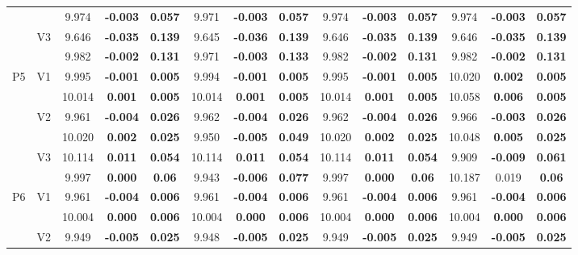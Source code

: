 \documentclass[12pt,a4paper]{article}
\begin{document}
\begin{sidewaystable}[H]
{\begin{tabular}{cc|ccc|ccc|ccc|ccc|}
   &  & 9.974 & \textbf{-0.003} & \textbf{0.057} & 9.971 & \textbf{-0.003} & \textbf{0.057} & 9.974 & \textbf{-0.003} & \textbf{0.057} & 9.974 & \textbf{-0.003} & \textbf{0.057} \\ 
   & \multirow{2}{*}{V3} & 9.646 & \textbf{-0.035} & \textbf{0.139} & 9.645 & \textbf{-0.036} & \textbf{0.139} & 9.646 & \textbf{-0.035} & \textbf{0.139} & 9.646 & \textbf{-0.035} & \textbf{0.139} \\ 
   &  & 9.982 & \textbf{-0.002} & \textbf{0.131} & 9.971 & \textbf{-0.003} & \textbf{0.133} & 9.982 & \textbf{-0.002} & \textbf{0.131} & 9.982 & \textbf{-0.002} & \textbf{0.131} \\ 
   \hline \hline\multirow{6}{*}{P5} & \multirow{2}{*}{V1} & 9.995 & \textbf{-0.001} & \textbf{0.005} & 9.994 & \textbf{-0.001} & \textbf{0.005} & 9.995 & \textbf{-0.001} & \textbf{0.005} & 10.020 & \textbf{0.002} & \textbf{0.005} \\ 
   &  & 10.014 & \textbf{0.001} & \textbf{0.005} & 10.014 & \textbf{0.001} & \textbf{0.005} & 10.014 & \textbf{0.001} & \textbf{0.005} & 10.058 & \textbf{0.006} & \textbf{0.005} \\ 
   & \multirow{2}{*}{V2} & 9.961 & \textbf{-0.004} & \textbf{0.026} & 9.962 & \textbf{-0.004} & \textbf{0.026} & 9.962 & \textbf{-0.004} & \textbf{0.026} & 9.966 & \textbf{-0.003} & \textbf{0.026} \\ 
   &  & 10.020 & \textbf{0.002} & \textbf{0.025} & 9.950 & \textbf{-0.005} & \textbf{0.049} & 10.020 & \textbf{0.002} & \textbf{0.025} & 10.048 & \textbf{0.005} & \textbf{0.025} \\ 
   & \multirow{2}{*}{V3} & 10.114 & \textbf{0.011} & \textbf{0.054} & 10.114 & \textbf{0.011} & \textbf{0.054} & 10.114 & \textbf{0.011} & \textbf{0.054} & 9.909 & \textbf{-0.009} & \textbf{0.061} \\ 
   &  & 9.997 & \textbf{0.000} & \textbf{0.06} & 9.943 & \textbf{-0.006} & \textbf{0.077} & 9.997 & \textbf{0.000} & \textbf{0.06} & 10.187 & 0.019 & \textbf{0.06} \\ 
   \hline \hline\multirow{6}{*}{P6} & \multirow{2}{*}{V1} & 9.961 & \textbf{-0.004} & \textbf{0.006} & 9.961 & \textbf{-0.004} & \textbf{0.006} & 9.961 & \textbf{-0.004} & \textbf{0.006} & 9.961 & \textbf{-0.004} & \textbf{0.006} \\ 
   &  & 10.004 & \textbf{0.000} & \textbf{0.006} & 10.004 & \textbf{0.000} & \textbf{0.006} & 10.004 & \textbf{0.000} & \textbf{0.006} & 10.004 & \textbf{0.000} & \textbf{0.006} \\ 
   & \multirow{2}{*}{V2} & 9.949 & \textbf{-0.005} & \textbf{0.025} & 9.948 & \textbf{-0.005} & \textbf{0.025} & 9.949 & \textbf{-0.005} & \textbf{0.025} & 9.949 & \textbf{-0.005} & \textbf{0.025} \\ 

\end{tabular}}
\end{sidewaystable}
\end{document}
